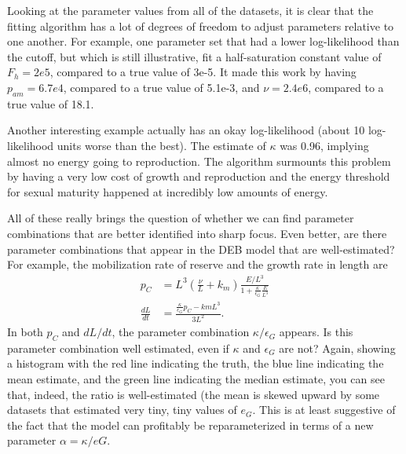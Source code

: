 \documentclass[12pt,reqno,final]{amsart}
\theoremstyle{plain}
\numberwithin{equation}{part}
\begin{document}
Looking at the parameter values from all of the datasets, it is clear
that the fitting algorithm has a lot of degrees of freedom to adjust
parameters relative to one another. For example, one parameter set that had a
lower log-likelihood than the cutoff, but which is still illustrative,
fit a half-saturation constant value of $F_h=2e5$, compared to a true
value of 3e-5. It made this work by having $p_{am}=6.7e4$,
compared to a true value of 5.1e-3, and $\nu=2.4e6$, compared to a
true value of 18.1.

Another interesting example actually has an okay log-likelihood (about
10 log-likelihood units worse than the best). The estimate of
$\kappa$ was 0.96, implying almost no energy going to
reproduction. The algorithm surmounts this problem by having a very
low cost of growth and reproduction and the energy threshold for sexual maturity
happened at incredibly low amounts of energy.

All of these really brings the question of whether we can find
parameter combinations that are better identified into sharp focus. Even
better, are there parameter combinations that appear in the DEB model
that are well-estimated? For example, the mobilization rate of reserve
and the growth rate in length are
\begin{align}
  p_C &= L^3\left(\frac{\nu}{L} +
    k_m\right)\frac{E/L^3}{1+\frac{\kappa}{\epsilon_G} \frac{E}{L^3}} \\
  \frac{dL}{dt} &= \frac{\frac{\kappa}{\epsilon_G} p_C-km L^3}{3 L^2}.
\end{align}
In both $p_C$ and $dL/dt$, the parameter combination
$\kappa/\epsilon_G$ appears. Is this parameter combination well
estimated, even if $\kappa$ and $\epsilon_G$ are not? Again, showing a
histogram with the red line indicating the truth, the blue line
indicating the mean estimate, and the green line indicating the median
estimate, you can see that, indeed, the ratio is well-estimated (the
mean is skewed upward by some datasets that estimated very tiny, tiny
values of $e_G$. This is at least suggestive of the fact that the
model can profitably be reparameterized in terms of a new parameter
$\alpha = \kappa/eG$.
\end{document}

